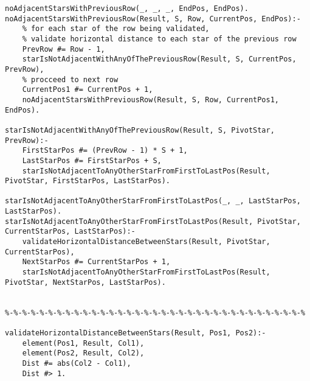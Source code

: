 \documentclass[runningheads,a4paper]{llncs}
\begin{document}
\begin{changemargin}{-3cm}{-4cm}
\begin{verbatim}
noAdjacentStarsWithPreviousRow(_, _, _, EndPos, EndPos).
noAdjacentStarsWithPreviousRow(Result, S, Row, CurrentPos, EndPos):-
    % for each star of the row being validated,
    % validate horizontal distance to each star of the previous row
    PrevRow #= Row - 1,
    starIsNotAdjacentWithAnyOfThePreviousRow(Result, S, CurrentPos, PrevRow),
    % procceed to next row
    CurrentPos1 #= CurrentPos + 1,
    noAdjacentStarsWithPreviousRow(Result, S, Row, CurrentPos1, EndPos).

starIsNotAdjacentWithAnyOfThePreviousRow(Result, S, PivotStar, PrevRow):-
    FirstStarPos #= (PrevRow - 1) * S + 1,
    LastStarPos #= FirstStarPos + S,
    starIsNotAdjacentToAnyOtherStarFromFirstToLastPos(Result, PivotStar, FirstStarPos, LastStarPos).

starIsNotAdjacentToAnyOtherStarFromFirstToLastPos(_, _, LastStarPos, LastStarPos).
starIsNotAdjacentToAnyOtherStarFromFirstToLastPos(Result, PivotStar, CurrentStarPos, LastStarPos):-
    validateHorizontalDistanceBetweenStars(Result, PivotStar, CurrentStarPos),
    NextStarPos #= CurrentStarPos + 1,
    starIsNotAdjacentToAnyOtherStarFromFirstToLastPos(Result, PivotStar, NextStarPos, LastStarPos).


%-%-%-%-%-%-%-%-%-%-%-%-%-%-%-%-%-%-%-%-%-%-%-%-%-%-%-%-%-%-%-%-%-%-%

validateHorizontalDistanceBetweenStars(Result, Pos1, Pos2):-
    element(Pos1, Result, Col1),
    element(Pos2, Result, Col2),
    Dist #= abs(Col2 - Col1),
    Dist #> 1.
    
    
\end{verbatim}
\end{changemargin}
\end{document}
